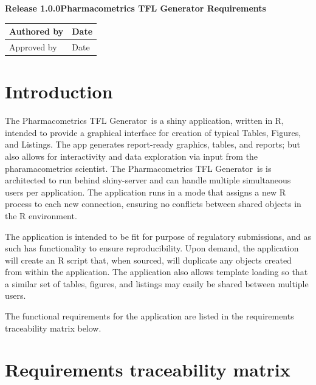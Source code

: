 \documentclass{article}
\newcommand{\optitle}{Pharmacometrics TFL Generator Requirements}
\newcommand{\opnum}{Release 1.0.0}
\newcommand{\tfl}{Pharmacometrics TFL Generator}
\begin{document}
\vspace*{3cm}
{\Large{\textbf{\opnum\newline \newline \optitle}}}
\vspace{3.0cm}

\begin{tabular}{p{11.0cm}p{2.0cm}}
\hline
Authored by & Date \vspace{1cm}\\

\hline
Approved by & Date \vspace{2cm}\\

\end{tabular}


\newpage
\vspace{3in}
\section*{Introduction}
The \tfl\ is a shiny application, written in R, intended to provide a graphical interface for creation of typical Tables, Figures, and Listings.  The app generates report-ready graphics, tables, and reports; but also allows for interactivity and data exploration via input from the pharamacometrics scientist.  The \tfl\ is is architected to run behind shiny-server and can handle multiple simultaneous users per application.  The application runs in a mode that assigns a new R process to each new connection, ensuring no conflicts between shared objects in the R environment. 

The application is intended to be fit for purpose of regulatory submissions, and as such has functionality to ensure reproducibility.  Upon demand, the application will create an R script that, when sourced, will duplicate any objects created from within the application.  The application also allows template loading so that a similar set of tables, figures, and listings may easily be shared between multiple users.

The functional requirements for the application are listed in the requirements traceability matrix below.
\newpage
\section*{Requirements traceability matrix}


\end{document}
